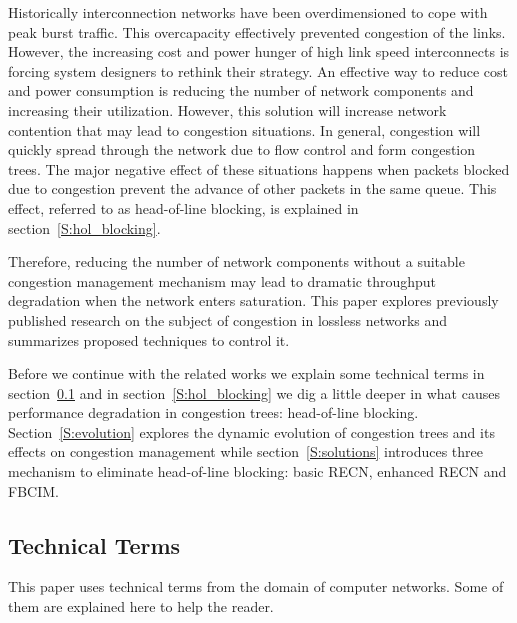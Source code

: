 Historically interconnection networks have been overdimensioned to cope with peak burst traffic. This overcapacity effectively prevented congestion of the links. However, the increasing cost and power hunger of high link speed interconnects is forcing system designers to rethink their strategy. An effective way to reduce cost and power consumption is reducing the number of network components and increasing their utilization. However, this solution will increase network contention that may lead to congestion situations. In general, congestion will quickly spread through the network due to flow control and form congestion trees. The major negative effect of these situations happens when packets blocked due to congestion prevent the advance of other packets in the same queue. This effect, referred to as head-of-line blocking, is explained in section~\ref{S:hol_blocking}.

Therefore, reducing the number of network components without a suitable congestion management mechanism may lead to dramatic throughput degradation when the network enters saturation.
This paper explores previously published research on the subject of congestion in lossless networks and summarizes proposed techniques to control it.

Before we continue with the related works we explain some technical terms in section~\ref{S:terms} and in section~\ref{S:hol_blocking} we dig a little deeper in what causes performance degradation in congestion trees: head-of-line blocking. Section~\ref{S:evolution} explores the dynamic evolution of congestion trees and its effects on congestion management while section~\ref{S:solutions} introduces three mechanism to eliminate head-of-line blocking: basic RECN, enhanced RECN and FBCIM.

\subsection{Technical Terms}\label{S:terms}
This paper uses technical terms from the domain of computer networks. Some of them are explained here to help the reader.

